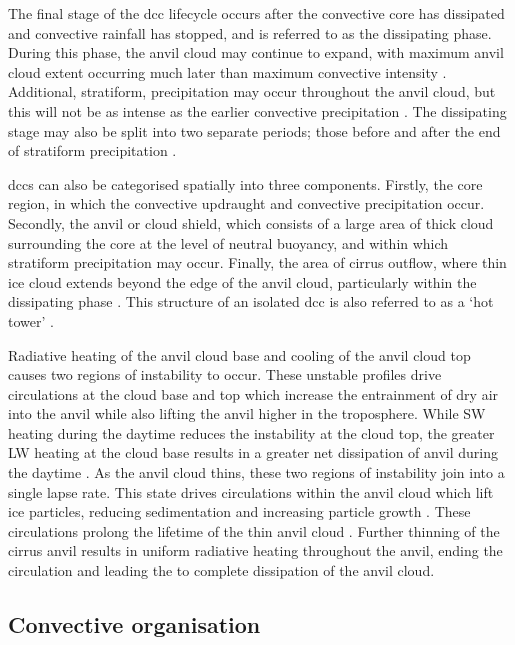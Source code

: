 The final stage of the \acrshort{dcc} lifecycle occurs after the convective core has dissipated and convective rainfall has stopped, and is referred to as the dissipating phase.
During this phase, the anvil cloud may continue to expand, with maximum anvil cloud extent occurring much later than maximum convective intensity \citep{futyan_deep_2007}.
Additional, stratiform, precipitation may occur throughout the anvil cloud, but this will not be as intense as the earlier convective precipitation \citep{houze_chapter_2014}.
The dissipating stage may also be split into two separate periods; those before and after the end of stratiform precipitation \citep{wall_life_2018}.

\acrshort{dcc}s can also be categorised spatially into three components.
Firstly, the core region, in which the convective updraught and convective precipitation occur.
Secondly, the anvil or cloud shield, which consists of a large area of thick cloud surrounding the core at the level of neutral buoyancy, and within which stratiform precipitation may occur.
Finally, the area of cirrus outflow, where thin ice cloud extends beyond the edge of the anvil cloud, particularly within the dissipating phase \citep{lilly_cirrus_1988}.
This structure of an isolated \acrshort{dcc} is also referred to as a `hot tower' \citep{riehl_northeast_1951}.

Radiative heating of the anvil cloud base and cooling of the anvil cloud top causes two regions of instability to occur. 
These unstable profiles drive circulations at the cloud base and top which increase the entrainment of dry air into the anvil while also lifting the anvil higher in the troposphere. 
While SW heating during the daytime reduces the instability at the cloud top, the greater LW heating at the cloud base results in a greater net dissipation of anvil during the daytime \citep{sokol_tropical_2020}. 
As the anvil cloud thins, these two regions of instability join into a single lapse rate. 
This state drives circulations within the anvil cloud which lift ice particles, reducing sedimentation and increasing particle growth \citep{gasparini_opinion_2023}. 
These circulations prolong the lifetime of the thin anvil cloud \citep{sokol_tropical_2020}. 
Further thinning of the cirrus anvil results in uniform radiative heating throughout the anvil, ending the circulation and leading the to complete dissipation of the anvil cloud. 


\subsection{Convective organisation}

